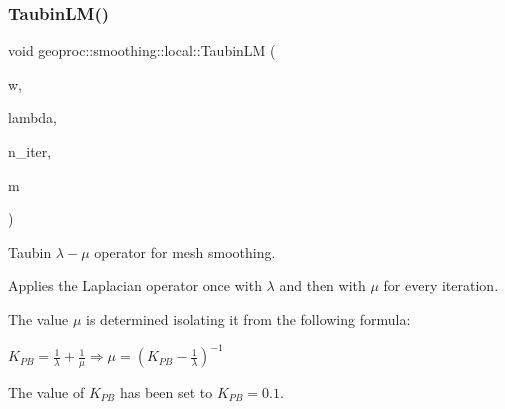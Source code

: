 \subsubsection{\texorpdfstring{Taubin\+L\+M()}{TaubinLM()}\hspace{0.1cm}{\footnotesize\ttfamily [1/2]}}
{\footnotesize\ttfamily void geoproc\+::smoothing\+::local\+::\+Taubin\+LM (\begin{DoxyParamCaption}\item[{const \hyperlink{namespacegeoproc_a12e5a10581b53b9dd9a509127527f843}{weight} \&}]{w,  }\item[{double}]{lambda,  }\item[{size\+\_\+t}]{n\+\_\+iter,  }\item[{\hyperlink{classgeoproc_1_1TriangleMesh}{Triangle\+Mesh} \&}]{m }\end{DoxyParamCaption})}



Taubin $\lambda-\mu$ operator for mesh smoothing. 

Applies the Laplacian operator once with $\lambda$ and then with $\mu$ for every iteration.

The value $\mu$ is determined isolating it from the following formula\+:

$K_{PB} = \frac{1}{\lambda} + \frac{1}{\mu} \Rightarrow \mu = \left( K_{PB} - \frac{1}{\lambda} \right)^{-1}$

The value of $K_{PB}$ has been set to $K_{PB}=0.1$.


